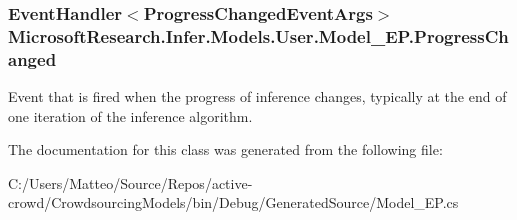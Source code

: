 \subsubsection[{Progress\+Changed}]{\setlength{\rightskip}{0pt plus 5cm}Event\+Handler$<$Progress\+Changed\+Event\+Args$>$ Microsoft\+Research.\+Infer.\+Models.\+User.\+Model\+\_\+\+E\+P.\+Progress\+Changed}\label{class_microsoft_research_1_1_infer_1_1_models_1_1_user_1_1_model___e_p_ae3a4699a135334bb8924925ab33a1999}


Event that is fired when the progress of inference changes, typically at the end of one iteration of the inference algorithm.



The documentation for this class was generated from the following file\+:\begin{DoxyCompactItemize}
\item 
C\+:/\+Users/\+Matteo/\+Source/\+Repos/active-\/crowd/\+Crowdsourcing\+Models/bin/\+Debug/\+Generated\+Source/Model\+\_\+\+E\+P.\+cs\end{DoxyCompactItemize}
